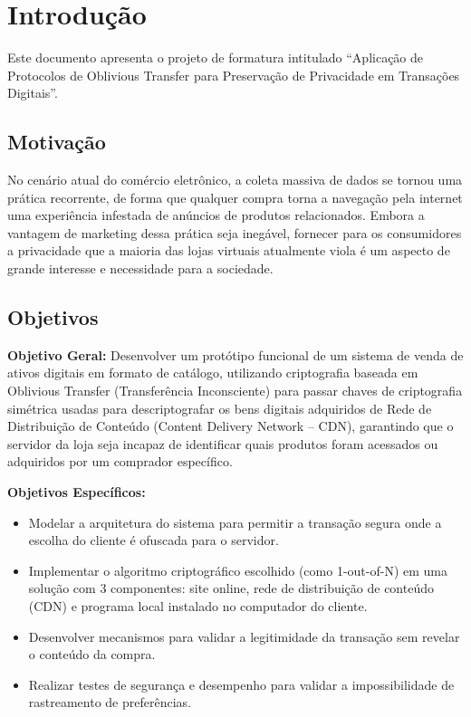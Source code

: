 \documentclass[12pt, oneside, a4paper, english, brazil]{abntex2}
\begin{document}
\chapter{Introdução}

Este documento apresenta o projeto de formatura intitulado ``Aplicação de
Protocolos de Oblivious Transfer para Preservação de Privacidade em Transações
Digitais''.

\section{Motivação}

No cenário atual do comércio eletrônico, a coleta massiva de dados se tornou
uma prática recorrente, de forma que qualquer compra torna a navegação pela
internet uma experiência infestada de anúncios de produtos relacionados.
Embora a vantagem de marketing dessa prática seja inegável, fornecer para os
consumidores a privacidade que a maioria das lojas virtuais atualmente viola é
um aspecto de grande interesse e necessidade para a sociedade.

\section{Objetivos}

\textbf{Objetivo Geral:} Desenvolver um protótipo funcional de um sistema de
venda de ativos digitais em formato de catálogo, utilizando criptografia
baseada em Oblivious Transfer (Transferência Inconsciente) para passar chaves
de criptografia simétrica usadas para descriptografar os bens digitais
adquiridos de Rede de Distribuição de Conteúdo (Content Delivery Network --
CDN), garantindo que o servidor da loja seja incapaz de identificar quais
produtos foram acessados ou adquiridos por um comprador específico.

\textbf{Objetivos Específicos:}

\begin{itemize}
\item Modelar a arquitetura do sistema para permitir a transação segura onde a
escolha do cliente é ofuscada para o servidor.
\item Implementar o algoritmo criptográfico escolhido (como 1-out-of-N) em uma
solução com 3 componentes: site online, rede de distribuição de conteúdo (CDN)
e programa local instalado no computador do cliente.
\item Desenvolver mecanismos para validar a legitimidade da transação sem
revelar o conteúdo da compra.
\item Realizar testes de segurança e desempenho para validar a impossibilidade
de rastreamento de preferências.
\end{itemize}
\end{document}
